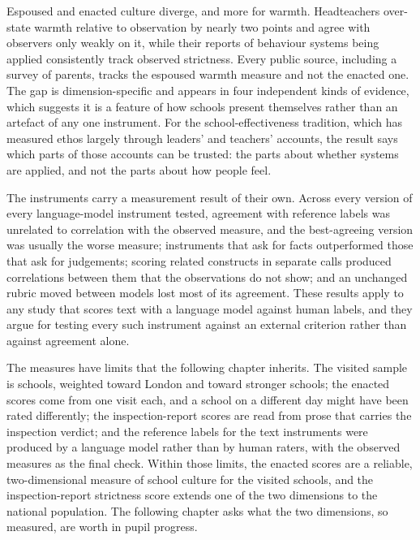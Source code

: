 Espoused and enacted culture diverge, and more for warmth. Headteachers
over-state warmth relative to observation by nearly two points and agree with
observers only weakly on it, while their reports of behaviour systems being
applied consistently track observed strictness. Every public source, including
a survey of parents, tracks the espoused warmth measure and not the enacted
one. The gap is dimension-specific and appears in four independent kinds of
evidence, which suggests it is a feature of how schools present themselves
rather than an artefact of any one instrument. For the school-effectiveness
tradition, which has measured ethos largely through leaders' and teachers'
accounts, the result says which parts of those accounts can be trusted: the
parts about whether systems are applied, and not the parts about how people
feel.

The instruments carry a measurement result of their own. Across every version
of every language-model instrument tested, agreement with reference labels
was unrelated to correlation with the observed measure, and the best-agreeing
version was usually the worse measure; instruments that ask for facts
outperformed those that ask for judgements; scoring related constructs in
separate calls produced correlations between them that the observations do
not show; and an unchanged rubric moved between models lost most of its
agreement. These results apply to any study that scores text with a language
model against human labels, and they argue for testing every such instrument
against an external criterion rather than against agreement alone.

The measures have limits that the following chapter inherits. The visited
sample is \NTierOne{} schools, weighted toward London and toward stronger
schools; the enacted scores come from one visit each, and a school on a
different day might have been rated differently; the inspection-report scores
are read from prose that carries the inspection verdict; and the reference
labels for the text instruments were produced by a language model rather than
by human raters, with the observed measures as the final check. Within those
limits, the enacted scores are a reliable, two-dimensional measure of school
culture for the visited schools, and the inspection-report strictness score
extends one of the two dimensions to the national population. The following
chapter asks what the two dimensions, so measured, are worth in pupil
progress.
